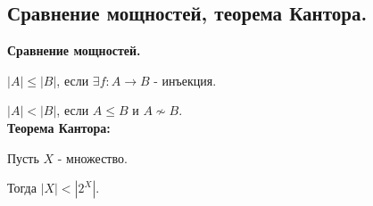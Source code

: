 \subsection{Сравнение мощностей, теорема Кантора.}
\textbf{Сравнение мощностей.}

$|A| \leq |B|$, если $\exists f : A \to B$ - инъекция.

$|A| < |B|$, если $A \leq B$ и $A \not \sim B$.\\

\textbf{Теорема Кантора:}

Пусть $X$ - множество.

Тогда $|X| < |2^X|$.
